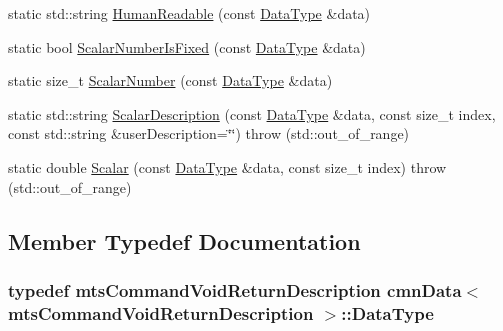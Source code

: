 \begin{DoxyCompactItemize}
\item 
static std\-::string \hyperlink{classcmn_data_3_01mts_command_void_return_description_01_4_a4702aea0e703003e2c82f225a98ae819}{Human\-Readable} (const \hyperlink{classcmn_data_3_01mts_command_void_return_description_01_4_aff459b36dbdb34ec4dc27dbfea116040}{Data\-Type} \&data)
\item 
static bool \hyperlink{classcmn_data_3_01mts_command_void_return_description_01_4_ae71560bec430da0705024e03a5b5a540}{Scalar\-Number\-Is\-Fixed} (const \hyperlink{classcmn_data_3_01mts_command_void_return_description_01_4_aff459b36dbdb34ec4dc27dbfea116040}{Data\-Type} \&data)
\item 
static size\-\_\-t \hyperlink{classcmn_data_3_01mts_command_void_return_description_01_4_ab07f8cc8cca1946df9f77be7338dca8e}{Scalar\-Number} (const \hyperlink{classcmn_data_3_01mts_command_void_return_description_01_4_aff459b36dbdb34ec4dc27dbfea116040}{Data\-Type} \&data)
\item 
static std\-::string \hyperlink{classcmn_data_3_01mts_command_void_return_description_01_4_a08887a0dbebd28d98ab84ea6f640957d}{Scalar\-Description} (const \hyperlink{classcmn_data_3_01mts_command_void_return_description_01_4_aff459b36dbdb34ec4dc27dbfea116040}{Data\-Type} \&data, const size\-\_\-t index, const std\-::string \&user\-Description=\char`\"{}\char`\"{})  throw (std\-::out\-\_\-of\-\_\-range)
\item 
static double \hyperlink{classcmn_data_3_01mts_command_void_return_description_01_4_a250f112327ecb676bdc87b0784313616}{Scalar} (const \hyperlink{classcmn_data_3_01mts_command_void_return_description_01_4_aff459b36dbdb34ec4dc27dbfea116040}{Data\-Type} \&data, const size\-\_\-t index)  throw (std\-::out\-\_\-of\-\_\-range)
\end{DoxyCompactItemize}


\subsection{Member Typedef Documentation}
\hypertarget{classcmn_data_3_01mts_command_void_return_description_01_4_aff459b36dbdb34ec4dc27dbfea116040}{
\subsubsection[{Data\-Type}]{\setlength{\rightskip}{0pt plus 5cm}typedef {\bf mts\-Command\-Void\-Return\-Description} {\bf cmn\-Data}$<$ {\bf mts\-Command\-Void\-Return\-Description} $>$\-::{\bf Data\-Type}}}\label{classcmn_data_3_01mts_command_void_return_description_01_4_aff459b36dbdb34ec4dc27dbfea116040}


